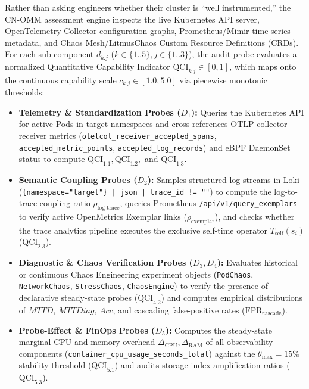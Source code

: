 Rather than asking engineers whether their cluster is ``well instrumented,'' the CN-OMM assessment engine inspects the live Kubernetes API server, OpenTelemetry Collector configuration graphs, Prometheus/Mimir time-series metadata, and Chaos Mesh/LitmusChaos Custom Resource Definitions (CRDs). For each sub-component $d_{k.j}$ ($k \in \{1..5\}, j \in \{1..3\}$), the audit probe evaluates a normalized Quantitative Capability Indicator $\text{QCI}_{k.j} \in [0, 1]$, which maps onto the continuous capability scale $c_{k.j} \in [1.0, 5.0]$ via piecewise monotonic thresholds:
\begin{itemize}[leftmargin=*, nosep]
    \item \textbf{Telemetry \& Standardization Probes ($D_1$):} Queries the Kubernetes API for active Pods in target namespaces and cross-references OTLP collector receiver metrics (\texttt{otelcol\_receiver\_accepted\_spans}, \texttt{accepted\_metric\_points}, \texttt{accepted\_log\_records}) and eBPF DaemonSet status to compute $\text{QCI}_{1.1}, \text{QCI}_{1.2},$ and $\text{QCI}_{1.3}$.
    \item \textbf{Semantic Coupling Probes ($D_2$):} Samples structured log streams in Loki (\texttt{\{namespace="target"\} | json | trace\_id != ""}) to compute the log-to-trace coupling ratio $\rho_{\text{log-trace}}$, queries Prometheus \texttt{/api/v1/query\_exemplars} to verify active OpenMetrics Exemplar links ($\rho_{\text{exemplar}}$), and checks whether the trace analytics pipeline executes the exclusive self-time operator $T_{\text{self}}(s_i)$ ($\text{QCI}_{2.3}$).
    \item \textbf{Diagnostic \& Chaos Verification Probes ($D_3, D_4$):} Evaluates historical or continuous Chaos Engineering experiment objects (\texttt{PodChaos}, \texttt{NetworkChaos}, \texttt{StressChaos}, \texttt{ChaosEngine}) to verify the presence of declarative steady-state probes ($\text{QCI}_{4.2}$) and computes empirical distributions of $MTTD$, $MTTDiag$, $Acc$, and cascading false-positive rates ($\text{FPR}_{\text{cascade}}$).
    \item \textbf{Probe-Effect \& FinOps Probes ($D_5$):} Computes the steady-state marginal CPU and memory overhead $\Delta_{\text{CPU}}, \Delta_{\text{RAM}}$ of all observability components (\texttt{container\_cpu\_usage\_seconds\_total}) against the $\theta_{\max} = 15\%$ stability threshold ($\text{QCI}_{5.1}$) and audits storage index amplification ratios ($\text{QCI}_{5.3}$).
\end{itemize}

